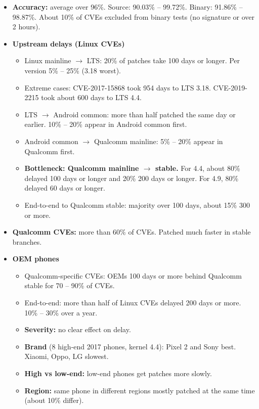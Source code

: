 \documentclass[11pt,a4paper]{article}
\begin{document}
\begin{enumerate}
    \begin{itemize}
        \item \textbf{Accuracy:} average over 96\%. Source: 90.03\% -- 99.72\%. Binary: 91.86\% -- 98.87\%. About 10\% of CVEs excluded from binary tests (no signature or over 2 hours).
        \item \textbf{Upstream delays (Linux CVEs)}
        \begin{itemize}
            \item Linux mainline $\rightarrow$ LTS: 20\% of patches take 100 days or longer. Per version 5\% -- 25\% (3.18 worst).
            \item Extreme cases: CVE-2017-15868 took 954 days to LTS 3.18. CVE-2019-2215 took about 600 days to LTS 4.4.
            \item LTS $\rightarrow$ Android common: more than half patched the same day or earlier. 10\% -- 20\% appear in Android common first.
            \item Android common $\rightarrow$ Qualcomm mainline: 5\% -- 20\% appear in Qualcomm first.
            \item \textbf{Bottleneck: Qualcomm mainline $\rightarrow$ stable.} For 4.4, about 80\% delayed 100 days or longer and 20\% 200 days or longer. For 4.9, 80\% delayed 60 days or longer.
            \item End-to-end to Qualcomm stable: majority over 100 days, about 15\% 300 or more.
        \end{itemize}
        \item \textbf{Qualcomm CVEs:} more than 60\% of CVEs. Patched much faster in stable branches.
        \item \textbf{OEM phones}
        \begin{itemize}
            \item Qualcomm-specific CVEs: OEMs 100 days or more behind Qualcomm stable for 70 -- 90\% of CVEs.
            \item End-to-end: more than half of Linux CVEs delayed 200 days or more. 10\% -- 30\% over a year.
            \item \textbf{Severity:} no clear effect on delay.
            \item \textbf{Brand} (8 high-end 2017 phones, kernel 4.4): Pixel 2 and Sony best. Xiaomi, Oppo, LG slowest.
            \item \textbf{High vs low-end:} low-end phones get patches more slowly.
            \item \textbf{Region:} same phone in different regions mostly patched at the same time (about 10\% differ).

\end{itemize}
\end{itemize}
\end{enumerate}
\end{document}
